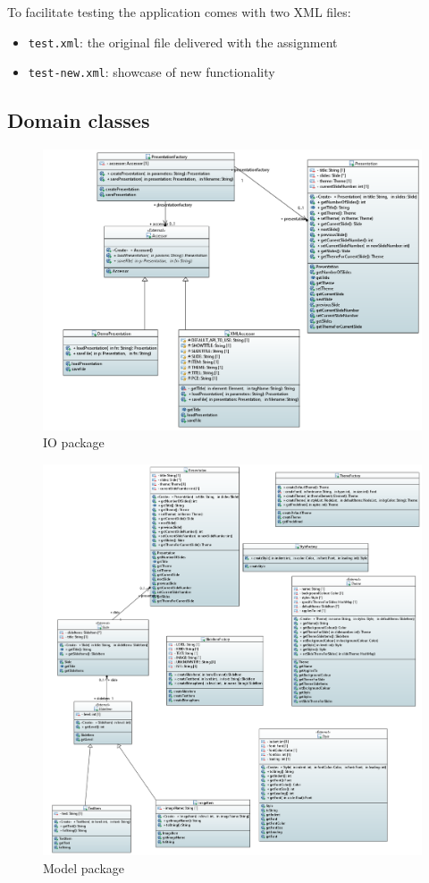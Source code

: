 \documentclass[a4paper]{article}
\begin{document}
To facilitate testing the application comes with two XML files: 
\begin{itemize}
\item \texttt{test.xml}: the original file delivered with the assignment
\item \texttt{test-new.xml}: showcase of new functionality
\end{itemize}

\subsection{Domain classes}
\begin{figure}[!htpb]
  \includegraphics[width=\linewidth]{IO.png}
  \caption{IO package}
  \label{fig:packdiag}
\end{figure}

\begin{figure}[!htpb]
  \includegraphics[width=\linewidth]{Model.png}
  \caption{Model package}
  \label{fig:packdiag}
\end{figure}
\end{document}
